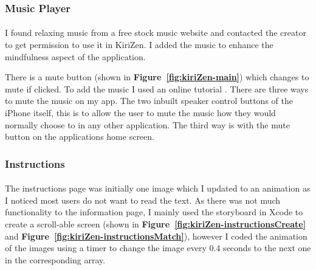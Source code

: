 \documentclass[11pt]{article}
\begin{document}
             \subsubsection{Music Player}
                         \paragraph{}

                I found relaxing music from a free stock music website \cite{Lofi}  
                and contacted the creator to get permission to use it in KiriZen. I added the music to enhance the mindfulness aspect of the application.
                
                There is a mute button (shown in \textbf{Figure~\ref{fig:kiriZen-main}}) which changes to mute if clicked. To add the music I used an online tutorial \cite{MusicPlayer}.
                There are three ways to mute the music on my app. The two inbuilt speaker control buttons of the iPhone itself, this is to allow the user to mute the music how they would normally choose to in any other application. The third way is with the mute button on the applications home screen.
                
        \subsubsection{Instructions}
            
                \paragraph{}
                    The instructions page was initially one image which I updated to an animation as I noticed most users do not want to read the text.
                    As there was not much functionality to the information page, I mainly used the storyboard in Xcode to create a scroll-able screen (shown in \textbf{Figure~\ref{fig:kiriZen-instructionsCreate}} and \textbf{Figure~\ref{fig:kiriZen-instructionsMatch}}), however I coded the animation of the images using a timer to change the image every 0.4 seconds to the next one in the corresponding array. 
           
\end{document}

